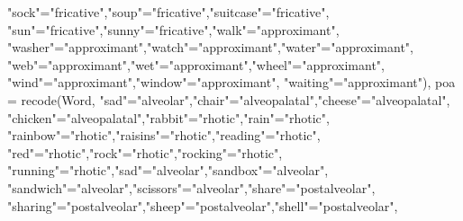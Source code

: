 \documentclass[
]{article}
\newenvironment{Shaded}{\begin{snugshade}}{\end{snugshade}}
\newcommand{\AttributeTok}[1]{\textcolor[rgb]{0.77,0.63,0.00}{#1}}
\newcommand{\FunctionTok}[1]{\textcolor[rgb]{0.00,0.00,0.00}{#1}}
\newcommand{\NormalTok}[1]{#1}
\newcommand{\OtherTok}[1]{\textcolor[rgb]{0.56,0.35,0.01}{#1}}
\newcommand{\StringTok}[1]{\textcolor[rgb]{0.31,0.60,0.02}{#1}}
\begin{document}
\begin{Shaded}
\begin{Highlighting}[]
                             \StringTok{"sock"}\OtherTok{=}\StringTok{"fricative"}\NormalTok{,}\StringTok{"soup"}\OtherTok{=}\StringTok{"fricative"}\NormalTok{,}\StringTok{"suitcase"}\OtherTok{=}\StringTok{"fricative"}\NormalTok{,}
                             \StringTok{"sun"}\OtherTok{=}\StringTok{"fricative"}\NormalTok{,}\StringTok{"sunny"}\OtherTok{=}\StringTok{"fricative"}\NormalTok{,}\StringTok{"walk"}\OtherTok{=}\StringTok{"approximant"}\NormalTok{,}
                             \StringTok{"washer"}\OtherTok{=}\StringTok{"approximant"}\NormalTok{,}\StringTok{"watch"}\OtherTok{=}\StringTok{"approximant"}\NormalTok{,}\StringTok{"water"}\OtherTok{=}\StringTok{"approximant"}\NormalTok{,}
                        \StringTok{"web"}\OtherTok{=}\StringTok{"approximant"}\NormalTok{,}\StringTok{"wet"}\OtherTok{=}\StringTok{"approximant"}\NormalTok{,}\StringTok{"wheel"}\OtherTok{=}\StringTok{"approximant"}\NormalTok{,}
                             \StringTok{"wind"}\OtherTok{=}\StringTok{"approximant"}\NormalTok{,}\StringTok{"window"}\OtherTok{=}\StringTok{"approximant"}\NormalTok{, }\StringTok{"waiting"}\OtherTok{=}\StringTok{"approximant"}\NormalTok{),}
         \AttributeTok{poa =} \FunctionTok{recode}\NormalTok{(Word, }\StringTok{"sad"}\OtherTok{=}\StringTok{"alveolar"}\NormalTok{,}\StringTok{"chair"}\OtherTok{=}\StringTok{"alveopalatal"}\NormalTok{,}\StringTok{"cheese"}\OtherTok{=}\StringTok{"alveopalatal"}\NormalTok{,}
                       \StringTok{"chicken"}\OtherTok{=}\StringTok{"alveopalatal"}\NormalTok{,}\StringTok{"rabbit"}\OtherTok{=}\StringTok{"rhotic"}\NormalTok{,}\StringTok{"rain"}\OtherTok{=}\StringTok{"rhotic"}\NormalTok{,}
                       \StringTok{"rainbow"}\OtherTok{=}\StringTok{"rhotic"}\NormalTok{,}\StringTok{"raisins"}\OtherTok{=}\StringTok{"rhotic"}\NormalTok{,}\StringTok{"reading"}\OtherTok{=}\StringTok{"rhotic"}\NormalTok{,}
                       \StringTok{"red"}\OtherTok{=}\StringTok{"rhotic"}\NormalTok{,}\StringTok{"rock"}\OtherTok{=}\StringTok{"rhotic"}\NormalTok{,}\StringTok{"rocking"}\OtherTok{=}\StringTok{"rhotic"}\NormalTok{,}
                       \StringTok{"running"}\OtherTok{=}\StringTok{"rhotic"}\NormalTok{,}\StringTok{"sad"}\OtherTok{=}\StringTok{"alveolar"}\NormalTok{,}\StringTok{"sandbox"}\OtherTok{=}\StringTok{"alveolar"}\NormalTok{,}
                       \StringTok{"sandwich"}\OtherTok{=}\StringTok{"alveolar"}\NormalTok{,}\StringTok{"scissors"}\OtherTok{=}\StringTok{"alveolar"}\NormalTok{,}\StringTok{"share"}\OtherTok{=}\StringTok{"postalveolar"}\NormalTok{,}
                       \StringTok{"sharing"}\OtherTok{=}\StringTok{"postalveolar"}\NormalTok{,}\StringTok{"sheep"}\OtherTok{=}\StringTok{"postalveolar"}\NormalTok{,}\StringTok{"shell"}\OtherTok{=}\StringTok{"postalveolar"}\NormalTok{,}

\end{Highlighting}
\end{Shaded}
\end{document}
